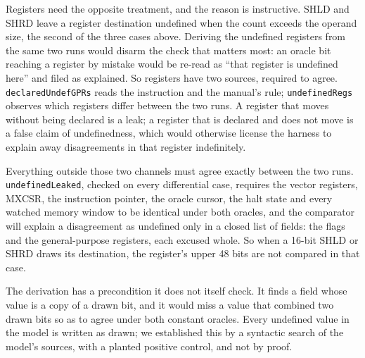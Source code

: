 \documentclass[runningheads]{llncs}
\newcommand{\src}[1]{}  %
\newcommand{\lean}[1]{\texttt{#1}}
\begin{document}
Registers need the opposite treatment, and the reason is instructive. SHLD and SHRD leave a register
destination undefined when the count exceeds the operand size, the second of the three cases above.
Deriving the undefined registers from the same
two runs would disarm the check that matters most: an oracle bit reaching a register by mistake would
be re-read as ``that register is undefined here'' and filed as explained. So registers have two
sources, required to agree. \lean{declaredUndefGPRs} reads the instruction and the manual's rule;
\lean{undefinedRegs} observes which registers differ between the two runs. A register that moves
without being declared is a leak; a register that is declared and does not move is a false claim of
undefinedness, which would otherwise license the harness to explain away disagreements in that register
indefinitely.
\src{X86/Serialize.lean declaredUndefGPRs, undefinedRegs, and the P1 batch 18 note; Tests/Nonvacuity.lean
shld\_w\_bad\_count\_declares\_and\_moves\_its\_destination, bsf\_zero\_source\_declares\_and\_moves\_no\_register; docs/DECISIONS.md D346:
BSF and BSR declared their destination here at a zero source until 325462-093US, read at its PDF 2026-10-14
(``If the content of the source operand is zero, the destination operand is unmodified.1''), made it unmodified}

Everything outside those two channels must agree exactly between the two runs.
\lean{undefinedLeaked}, checked on every differential case, requires the vector registers, MXCSR, the
instruction pointer, the oracle cursor, the halt state and every watched memory window to be identical
under both oracles,
and the comparator will explain a disagreement as undefined only in a closed list of fields: the flags
and the general-purpose registers, each excused whole. So when a 16-bit SHLD or SHRD draws its
destination, the register's upper 48 bits are not compared in that case.
\src{X86/Serialize.lean undefinedLeaked, movedRegs compares a.regs.get r whole; Main.lean undefinableFields (flagNames ++ GPR.all.map (.name .q));
X86/Semantics.lean the .dshift arm writes its draw with writeOperand sz; X86/Value.lean writeView, .w keeps bits 63:16; x86isa machine/instructions/bit.lisp
x86-bsf and x86-bsr leave the register unchanged at a zero source (acl2 c8897a34); docs/DECISIONS.md D346 1--2: until D346 a 32-bit BSF or BSR at a zero source was such an uncompared case, where x86lean cleared the upper half and x86isa kept it; both now keep it; Tests/Vectors.lean bsf\_rr\_d, bsf\_rm\_d, bsr\_rr\_d, bsr\_rm\_d}
The derivation has a precondition it does not itself check. It finds a field whose value is a copy of a
drawn bit, and it would miss a value that combined two drawn bits so as to agree under both constant
oracles. Every undefined value in the model is written as drawn; we established this by a syntactic
search of the model's sources, with a planted positive control, and not by proof.
\src{docs/DECISIONS.md D213 4}
\end{document}
